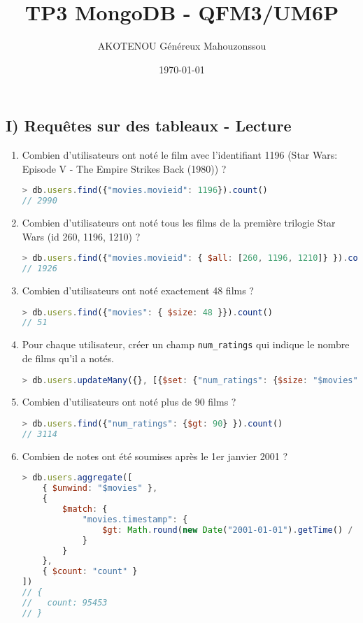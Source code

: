 \documentclass{article}
\title{TP3 MongoDB - QFM3/UM6P}
\author{AKOTENOU Généreux Mahouzonssou}
\date{\today}
\begin{document}
\maketitle

\subsection*{I) Requêtes sur des tableaux - Lecture}

\begin{enumerate}

\item Combien d'utilisateurs ont noté le film avec l'identifiant 1196 (Star Wars: Episode V - The Empire Strikes Back (1980)) ?
\begin{lstlisting}[language=JavaScript]
> db.users.find({"movies.movieid": 1196}).count()
// 2990
\end{lstlisting}

\item Combien d'utilisateurs ont noté tous les films de la première trilogie Star Wars (id 260, 1196, 1210) ?
\begin{lstlisting}[language=JavaScript]
> db.users.find({"movies.movieid": { $all: [260, 1196, 1210]} }).count()
// 1926
\end{lstlisting}

\item Combien d'utilisateurs ont noté exactement 48 films ?
\begin{lstlisting}[language=JavaScript]
> db.users.find({"movies": { $size: 48 }}).count()
// 51
\end{lstlisting}

\item Pour chaque utilisateur, créer un champ \texttt{num\_ratings} qui indique le nombre de films qu'il a notés.
\begin{lstlisting}[language=JavaScript]
> db.users.updateMany({}, [{$set: {"num_ratings": {$size: "$movies"}}}])
\end{lstlisting}

\item Combien d'utilisateurs ont noté plus de 90 films ?
\begin{lstlisting}[language=JavaScript]
> db.users.find({"num_ratings": {$gt: 90} }).count()
// 3114
\end{lstlisting}

\item Combien de notes ont été soumises après le 1er janvier 2001 ?
\begin{lstlisting}[language=JavaScript]
> db.users.aggregate([
    { $unwind: "$movies" }, 
    { 
        $match: {
            "movies.timestamp": {
                $gt: Math.round(new Date("2001-01-01").getTime() / 1000)
            } 
        } 
    }, 
    { $count: "count" }
])
// {
//   count: 95453
// }
\end{lstlisting}


\end{enumerate}
\end{document}
